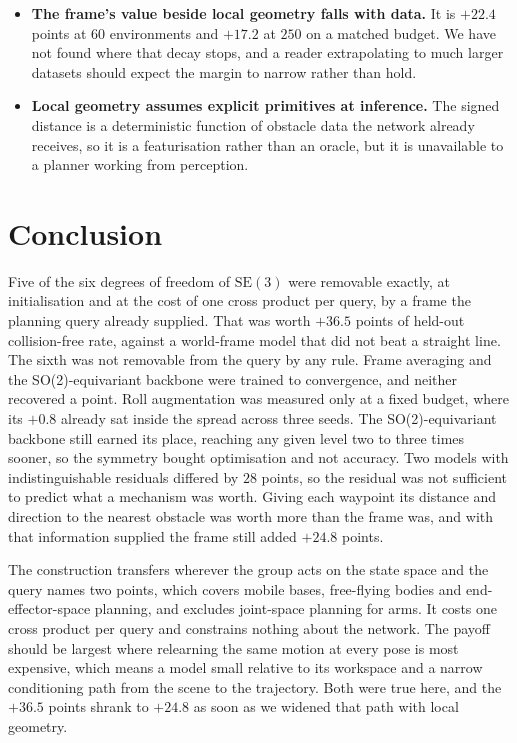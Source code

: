 \documentclass[conference]{IEEEtran}
\begin{document}
\begin{itemize}
  \item \textbf{The frame's value beside local geometry falls with data.} It is
  $+22.4$ points at $60$ environments and $+17.2$ at $250$ on a matched budget.
  We have not found where that decay stops, and a reader extrapolating to much
  larger datasets should expect the margin to narrow rather than hold.

  \item \textbf{Local geometry assumes explicit primitives at inference.} The
  signed distance is a deterministic function of obstacle data the network
  already receives, so it is a featurisation rather than an oracle, but it is
  unavailable to a planner working from perception.
\end{itemize}

\section{Conclusion}
Five of the six degrees of freedom of $\mathrm{SE}(3)$ were removable exactly,
at initialisation and at the cost of one cross product per query, by a frame the planning query already
supplied. That was worth $+36.5$ points of held-out collision-free rate,
against a world-frame model that did not beat a straight line. The sixth was
not removable from the query by any rule. Frame averaging and the SO(2)-equivariant backbone were trained to convergence, and neither recovered a point. Roll
augmentation was measured only at a fixed budget, where its $+0.8$ already sat
inside the spread across three seeds. The SO(2)-equivariant backbone still earned
its place, reaching any given level two to three times sooner, so the symmetry
bought optimisation and not accuracy. Two models with indistinguishable
residuals differed by $28$ points, so the residual was not sufficient to
predict what a mechanism was worth. Giving each waypoint its distance and
direction to the nearest obstacle was worth more than the frame was, and with
that information supplied the frame still added $+24.8$ points.

The construction transfers wherever the group acts on the state space and the
query names two points, which covers mobile bases, free-flying bodies and
end-effector-space planning, and excludes joint-space planning for arms. It
costs one cross product per query and constrains nothing about the network. The
payoff should be largest where relearning the same motion at every pose is
most expensive, which means a model small relative to its workspace and a
narrow conditioning path from the scene to the trajectory. Both were true here,
and the $+36.5$ points shrank to $+24.8$ as soon as we widened that path with
local geometry.
\end{document}
